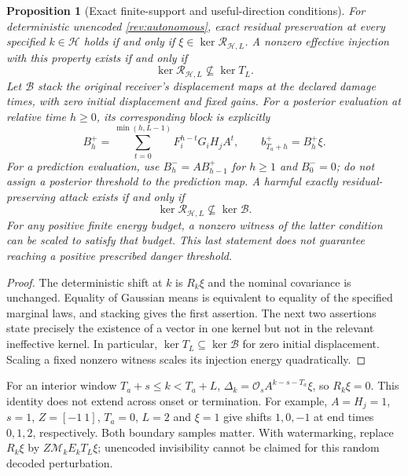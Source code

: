 \documentclass[11pt,a4paper]{article}
\newtheorem{proposition}{Proposition}
\begin{document}
\begin{proposition}[Exact finite-support and useful-direction conditions]
\label{rev:finitesupport}
For deterministic unencoded \eqref{rev:autonomous}, exact residual
preservation at every specified $k\in\mathcal H$ holds if and only if
$\xi\in\ker\mathscr R_{\mathcal H,L}$.
A nonzero effective injection with this property exists if and only if
\begin{equation}
 \ker\mathscr R_{\mathcal H,L}\not\subseteq\ker T_L.\label{rev:effective}
\end{equation}
Let $\mathscr B$ stack the original receiver's displacement maps at the
declared damage times, with zero initial displacement and fixed gains.
For a posterior evaluation at relative time $h\ge0$, its corresponding
block is explicitly
\[
 B_h^+=\sum_{t=0}^{\min(h,L-1)}F_i^{h-t}G_iH_jA^t,
 \qquad b_{T_a+h}^+=B_h^+\xi.
\]
For a prediction evaluation, use $B_h^-=AB_{h-1}^+$ for $h\ge1$
and $B_0^-=0$; do not assign a posterior threshold to the prediction map.
A harmful exactly residual-preserving attack exists if and only if
\begin{equation}
 \ker\mathscr R_{\mathcal H,L}\not\subseteq\ker\mathscr B.
 \label{rev:harm}
\end{equation}
For any positive finite energy budget, a nonzero witness of the latter
condition can be scaled to satisfy that budget. This last statement
does not guarantee reaching a positive prescribed danger threshold.
\end{proposition}
\begin{proof}
The deterministic shift at $k$ is $R_k\xi$ and the nominal covariance
is unchanged. Equality of Gaussian means is equivalent to equality of
the specified marginal laws, and stacking gives the first assertion.
The next two assertions state precisely the existence of a vector in
one kernel but not in the relevant ineffective kernel. In particular,
$\ker T_L\subseteq\ker\mathscr B$ for zero initial displacement.
Scaling a fixed nonzero witness scales its injection energy quadratically.
\end{proof}

For an interior window $T_a+s\le k<T_a+L$,
$\Delta_k=\mathcal O_sA^{k-s-T_a}\xi$, so $R_k\xi=0$.
This identity does not extend across onset or termination. For example,
$A=H_j=1$, $s=1$, $Z=[-1\ 1]$, $T_a=0$, $L=2$ and $\xi=1$
give shifts $1,0,-1$ at end times $0,1,2$, respectively.
Both boundary samples matter. With watermarking, replace $R_k\xi$ by
$Z\mathcal M_kE_kT_L\xi$; unencoded invisibility cannot be claimed for
this random decoded perturbation.
\end{document}
